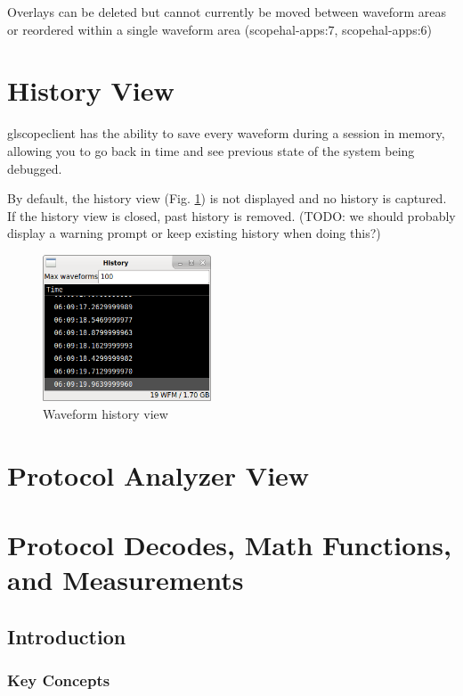 \documentclass[11pt]{article}
\begin{document}
Overlays can be deleted but cannot currently be moved between waveform areas or reordered within a single waveform area
(scopehal-apps:7, scopehal-apps:6)

\pagebreak
\section{History View}
\label{sec:history}

glscopeclient has the ability to save every waveform during a session in memory, allowing you to go back in time and
see previous state of the system being debugged.

By default, the history view (Fig. \ref{historyview}) is not displayed and no history is captured. If the history view
is closed, past history is removed. (TODO: we should probably display a warning prompt or keep existing history when
doing this?)



\begin{figure}[H]
\centering
\includegraphics[width=5cm]{images/history-view.png}
\caption{Waveform history view}
\label{historyview}
\end{figure}

\pagebreak
\section{Protocol Analyzer View}

\pagebreak
\section{Protocol Decodes, Math Functions, and Measurements}

\subsection{Introduction}

\subsubsection{Key Concepts}
\end{document}
